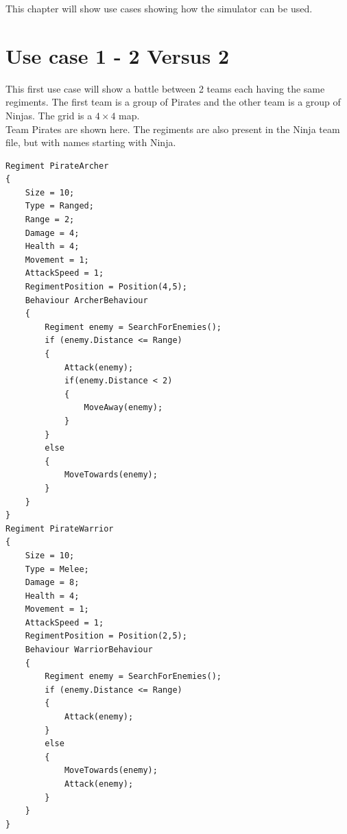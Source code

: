 This chapter will show use cases showing how the simulator can be used.

\section{Use case 1 - 2 Versus 2}
	This first use case will show a battle between 2 teams each having the same regiments.
	The first team is a group of Pirates and the other team is a group of Ninjas. The grid is a $4 \times 4$ map. \\
	Team Pirates are shown here. The regiments are also present in the Ninja team file, but with names starting with Ninja.
\begin{lstlisting}
Regiment PirateArcher
{
	Size = 10;
	Type = Ranged;
	Range = 2;
	Damage = 4;
	Health = 4;
	Movement = 1;
	AttackSpeed = 1;
	RegimentPosition = Position(4,5);
	Behaviour ArcherBehaviour
	{
		Regiment enemy = SearchForEnemies();
		if (enemy.Distance <= Range)
		{
			Attack(enemy);
			if(enemy.Distance < 2)
			{
				MoveAway(enemy);
			}
		}
		else
		{
			MoveTowards(enemy);
		}
	}
}
Regiment PirateWarrior
{
	Size = 10;
	Type = Melee;
	Damage = 8;
	Health = 4;
	Movement = 1;
	AttackSpeed = 1;
	RegimentPosition = Position(2,5);
	Behaviour WarriorBehaviour
	{
		Regiment enemy = SearchForEnemies();
		if (enemy.Distance <= Range)
		{
			Attack(enemy);
		}
		else
		{
			MoveTowards(enemy);
			Attack(enemy);
		}
	}
}
\end{lstlisting}

